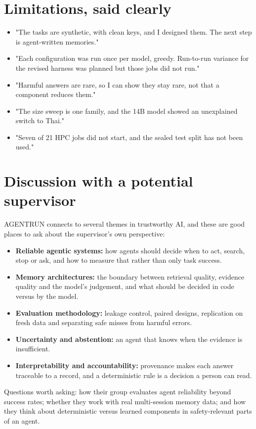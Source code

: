 \documentclass[10.5pt,a4paper,oneside]{report}
\begin{document}
\section{Limitations, said clearly}
\begin{itemize}
\item "The tasks are synthetic, with clean keys, and I designed them. The next step is agent-written memories."
\item "Each configuration was run once per model, greedy. Run-to-run variance for the revised harness was planned but those jobs did not run."
\item "Harmful answers are rare, so I can show they stay rare, not that a component reduces them."
\item "The size sweep is one family, and the 14B model showed an unexplained switch to Thai."
\item "Seven of 21 HPC jobs did not start, and the sealed test split has not been used."
\end{itemize}
\section{Discussion with a potential supervisor}
AGENTRUN connects to several themes in trustworthy AI, and these are good places to ask about the supervisor's own perspective:

\begin{itemize}
\item \textbf{Reliable agentic systems:} how agents should decide when to act, search, stop or ask, and how to measure that rather than only task success.
\item \textbf{Memory architectures:} the boundary between retrieval quality, evidence quality and the model's judgement, and what should be decided in code versus by the model.
\item \textbf{Evaluation methodology:} leakage control, paired designs, replication on fresh data and separating safe misses from harmful errors.
\item \textbf{Uncertainty and abstention:} an agent that knows when the evidence is insufficient.
\item \textbf{Interpretability and accountability:} provenance makes each answer traceable to a record, and a deterministic rule is a decision a person can read.
\end{itemize}
Questions worth asking: how their group evaluates agent reliability beyond success rates; whether they work with real multi-session memory data; and how they think about deterministic versus learned components in safety-relevant parts of an agent.
\end{document}
